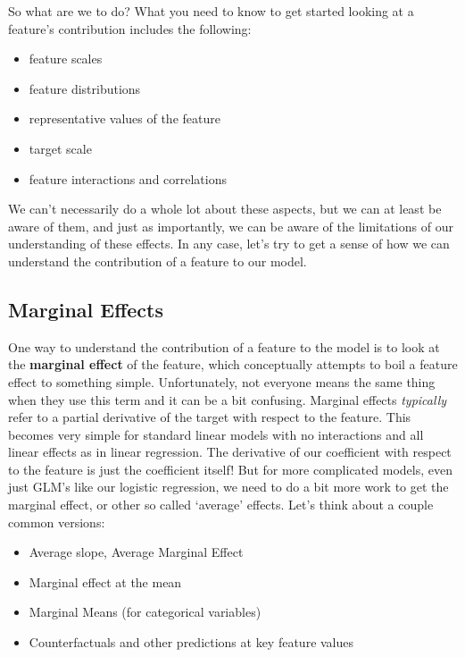 \documentclass[
  letterpaper,
]{krantz}
\providecommand{\tightlist}{%
  \setlength{\itemsep}{0pt}\setlength{\parskip}{0pt}}\usepackage{longtable,booktabs,array}
\begin{document}
So what are we to do? What you need to know to get started looking at a
feature's contribution includes the following:

\begin{itemize}
\tightlist
\item
  feature scales
\item
  feature distributions
\item
  representative values of the feature
\item
  target scale
\item
  feature interactions and correlations
\end{itemize}

We can't necessarily do a whole lot about these aspects, but we can at
least be aware of them, and just as importantly, we can be aware of the
limitations of our understanding of these effects. In any case, let's
try to get a sense of how we can understand the contribution of a
feature to our model.

\subsection{Marginal Effects}\label{sec-marginal-effects}

One way to understand the contribution of a feature to the model is to
look at the \textbf{marginal effect} of the feature, which conceptually
attempts to boil a feature effect to something simple. Unfortunately,
not everyone means the same thing when they use this term and it can be
a bit confusing. Marginal effects \emph{typically} refer to a partial
derivative of the target with respect to the feature. This becomes very
simple for standard linear models with no interactions and all linear
effects as in linear regression. The derivative of our coefficient with
respect to the feature is just the coefficient itself! But for more
complicated models, even just GLM's like our logistic regression, we
need to do a bit more work to get the marginal effect, or other so
called `average' effects. Let's think about a couple common versions:

\begin{itemize}
\tightlist
\item
  Average slope, Average Marginal Effect
\item
  Marginal effect at the mean
\item
  Marginal Means (for categorical variables)
\item
  Counterfactuals and other predictions at key feature values
\end{itemize}
\end{document}
